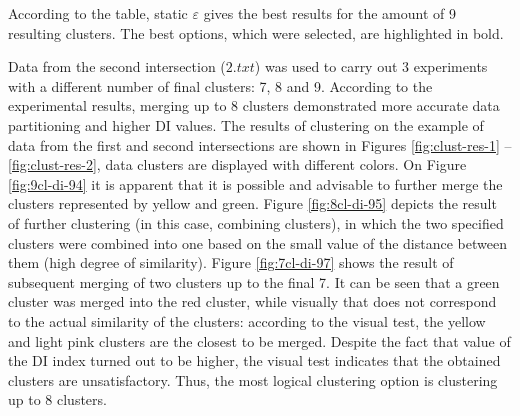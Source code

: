 According to the table, static $\varepsilon$ gives the best results for the amount of 9 resulting clusters. The best options, which were selected, are highlighted in bold.

Data from the second intersection ($2.txt$) was used to carry out 3 experiments with a different number of final clusters: 7, 8 and 9. According to the experimental results, merging up to 8 clusters demonstrated more accurate data partitioning and higher DI values. The results of clustering on the example of data from the first and second intersections are shown in Figures \ref{fig:clust-res-1} -- \ref{fig:clust-res-2}, data clusters are displayed with different colors. On Figure \ref{fig:9cl-di-94} it is apparent that it is possible and advisable to further merge the clusters represented by yellow and green. Figure \ref{fig:8cl-di-95} depicts the result of further clustering (in this case, combining clusters), in which the two specified clusters were combined into one based on the small value of the distance between them (high degree of similarity). Figure \ref{fig:7cl-di-97} shows the result of subsequent merging of two clusters up to the final 7. It can be seen that a green cluster was merged into the red cluster, while visually that does not correspond to the actual similarity of the clusters: according to the visual test, the yellow and light pink clusters are the closest to be merged. Despite the fact that value of the DI index turned out to be higher, the visual test indicates that the obtained clusters are unsatisfactory. Thus, the most logical clustering option is clustering up to 8 clusters.

